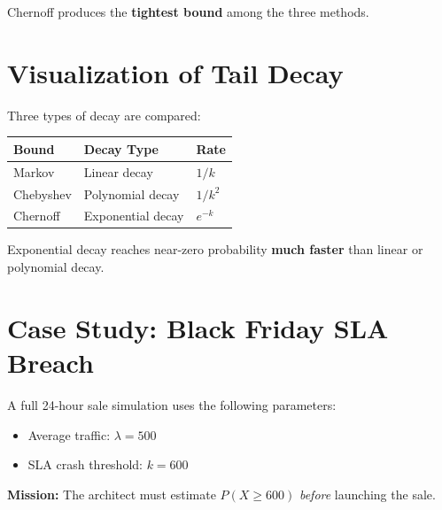 \documentclass[12pt, a4paper]{article}
\begin{document}
Chernoff produces the \textbf{tightest bound} among the three methods.

\section{Visualization of Tail Decay}

Three types of decay are compared:

\begin{center}
\begin{tabular}{lll}
  \toprule
  \textbf{Bound}  & \textbf{Decay Type}  & \textbf{Rate}    \\
  \midrule
  Markov          & Linear decay         & $1/k$            \\
  Chebyshev       & Polynomial decay     & $1/k^2$          \\
  Chernoff        & Exponential decay    & $e^{-k}$         \\
  \bottomrule
\end{tabular}
\end{center}

\begin{tcolorbox}[colback=lightgray, colframe=accentblue, title=Key Insight]
  Exponential decay reaches near-zero probability \textbf{much faster} than linear or
  polynomial decay.
\end{tcolorbox}

\section{Case Study: Black Friday SLA Breach}

A full 24-hour sale simulation uses the following parameters:
\begin{itemize}[leftmargin=2em]
  \item Average traffic: $\lambda = 500$
  \item SLA crash threshold: $k = 600$
\end{itemize}

\textbf{Mission:} The architect must estimate $P(X \geq 600)$ \emph{before} launching the sale.

\end{document}
